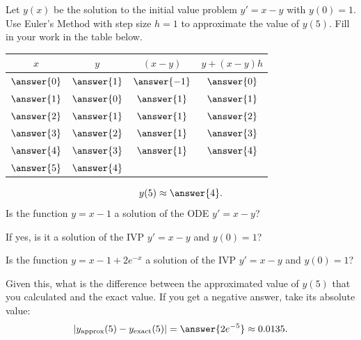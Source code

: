 \documentclass{ximera}
\begin{document}
\begin{exercise}
Let $y(x)$ be the solution to the initial value problem $y' = x-y$ with $y(0) = 1$. Use Euler's Method with step size $h = 1$ to approximate the value of $y(5)$. Fill in your work in the table below.
\begin{center}
\begin{tabular}{cccc}
$x$ & $y$ & $(x - y)$ & $y + (x - y) h$ \\
\hline
$\answer{0}$ & $\answer{1}$ & $\answer{-1}$ & $\answer{0}$ \\
$\answer{1}$ & $\answer{0}$ & $\answer{1}$ & $\answer{1}$ \\
$\answer{2}$ & $\answer{1}$ & $\answer{1}$ & $\answer{2}$ \\
$\answer{3}$ & $\answer{2}$ & $\answer{1}$ & $\answer{3}$ \\
$\answer{4}$ & $\answer{3}$ & $\answer{1}$ & $\answer{4}$  \\
$\answer{5}$ & $\answer{4}$
\end{tabular}
\end{center}
\[ y(5) \approx \answer{4}. \]
Is the function $y = x-1$ a solution of the ODE $y' = x-y$?
\begin{multipleChoice}
\end{multipleChoice}
If yes, is it a solution of the IVP $y' = x-y$ and $y(0) = 1$?
\begin{multipleChoice}
\end{multipleChoice}
Is the function $y = x -1 + 2 e^{-x}$ a solution of the IVP $y' = x-y$ and $y(0) = 1$?
\begin{multipleChoice}
\end{multipleChoice}
Given this, what is the difference between the approximated value of $y(5)$ that you calculated and the exact value. If you get a negative answer, take its absolute value:
\[ | y_{\text{approx}}(5) - y_{\text{exact}}(5)| = \answer{2 e^{-5}} \approx 0.0135. \]
\end{exercise}
\end{document}
